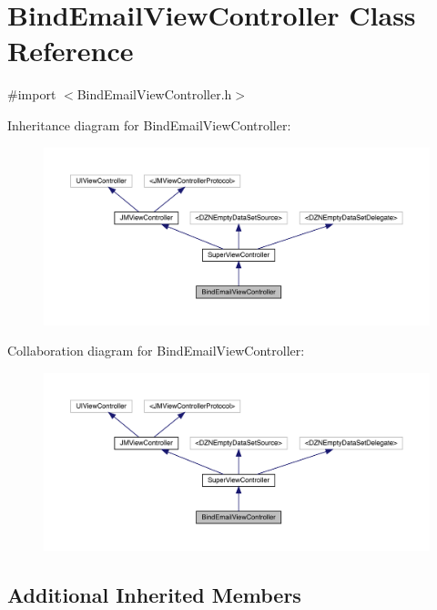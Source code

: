 \hypertarget{interface_bind_email_view_controller}{}\section{Bind\+Email\+View\+Controller Class Reference}
\label{interface_bind_email_view_controller}


{\ttfamily \#import $<$Bind\+Email\+View\+Controller.\+h$>$}



Inheritance diagram for Bind\+Email\+View\+Controller\+:\nopagebreak
\begin{figure}[H]
\begin{center}
\leavevmode
\includegraphics[width=350pt]{interface_bind_email_view_controller__inherit__graph}
\end{center}
\end{figure}


Collaboration diagram for Bind\+Email\+View\+Controller\+:\nopagebreak
\begin{figure}[H]
\begin{center}
\leavevmode
\includegraphics[width=350pt]{interface_bind_email_view_controller__coll__graph}
\end{center}
\end{figure}
\subsection*{Additional Inherited Members}


